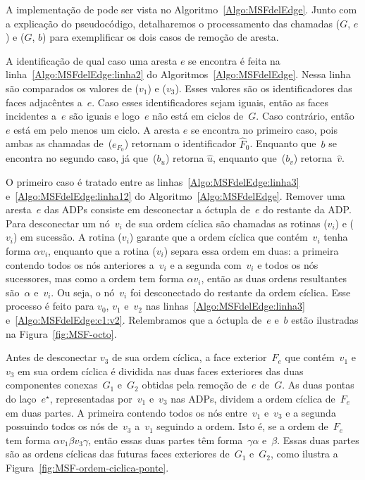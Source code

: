 A implementação de \MSFdelEdge{} pode ser vista no Algoritmo~\ref{Algo:MSFdelEdge}.
Junto com a explicação do pseudocódigo, detalharemos o processamento das chamadas \MSFdelEdge($G$, $e$) e \MSFdelEdge($G$, $b$) para exemplificar os dois casos de remoção de aresta.

A identificação de qual caso uma aresta $e$ se encontra é feita na linha~\ref{Algo:MSFdelEdge:linha2} do Algoritmos~\ref{Algo:MSFdelEdge}.
Nessa linha são comparados os valores de \LCOFindNode($v_1$) e \LCOFindNode($v_3$).
Esses valores são os identificadores das faces adjacêntes a~$e$.
Caso esses identificadores sejam iguais, então as faces incidentes a~$e$ são iguais e logo~$e$ não está em ciclos de~$G$.
Caso contrário, então~$e$ está em pelo menos um ciclo.
A aresta $e$ se encontra no primeiro caso, pois ambas as chamadas de~\LCOFindNode($e_{F_0}$) retornam o identificador $\hat F_0$.
Enquanto que~$b$ se encontra no segundo caso, já que~\LCOFindNode($b_u$) retorna $\hat u$, enquanto que~\LCOFindNode($b_v$) retorna~$\hat v$.

O primeiro caso é tratado entre as linhas~\ref{Algo:MSFdelEdge:linha3} e~\ref{Algo:MSFdelEdge:linha12} do Algoritmo~\ref{Algo:MSFdelEdge}.
Remover uma aresta~$e$ das ADPs consiste em desconectar a óctupla de~$e$ do restante da ADP. 
Para desconectar um nó~$v_i$ de sua ordem cíclica são chamadas as rotinas \LCOCycle($v_i$) e \LCOSplit($v_i$) em sucessão.
A rotina \LCOCycle($v_i$) garante que a ordem cíclica que contém~$v_i$ tenha forma $\alpha v_i$, enquanto que a rotina \LCOSplit($v_i$) separa essa ordem em duas: a primeira contendo todos os nós anteriores a~$v_i$ e a segunda com~$v_i$ e todos os nós sucessores, mas como a ordem tem forma $\alpha v_i$, então as duas ordens resultantes são~$\alpha$ e~$v_i$.
Ou seja, o nó~$v_i$ foi desconectado do restante da ordem cíclica.
Esse processo é feito para $v_0$, $v_1$ e~$v_2$ nas linhas~\ref{Algo:MSFdelEdge:linha3} e~\ref{Algo:MSFdelEdge:c1:v2}.
Relembramos que a óctupla de~$e$ e~$b$ estão ilustradas na Figura~\ref{fig:MSF-octo}.

Antes de desconectar $v_3$ de sua ordem cíclica, a face exterior~$F_e$ que contém~$v_1$ e~$v_3$ em sua ordem cíclica é dividida nas duas faces exteriores das duas componentes conexas~$G_1$ e~$G_2$ obtidas pela remoção de~$e$ de~$G$.
As duas pontas do laço~$e^\star$, representadas por~$v_1$ e~$v_3$ nas ADPs, dividem a ordem cíclica de~$F_e$ em duas partes.
A primeira contendo todos os nós entre~$v_1$ e~$v_3$ e a segunda possuindo todos os nós de~$v_3$ a~$v_1$ seguindo a ordem. 
Isto é, se a ordem de~$F_e$ tem forma $\alpha v_1\beta v_3\gamma$, então essas duas partes têm forma~$\gamma\alpha$ e~$\beta$.
Essas duas partes são as ordens cíclicas das futuras faces exteriores de~$G_1$ e~$G_2$, como ilustra a Figura~\ref{fig:MSF-ordem-ciclica-ponte}.

